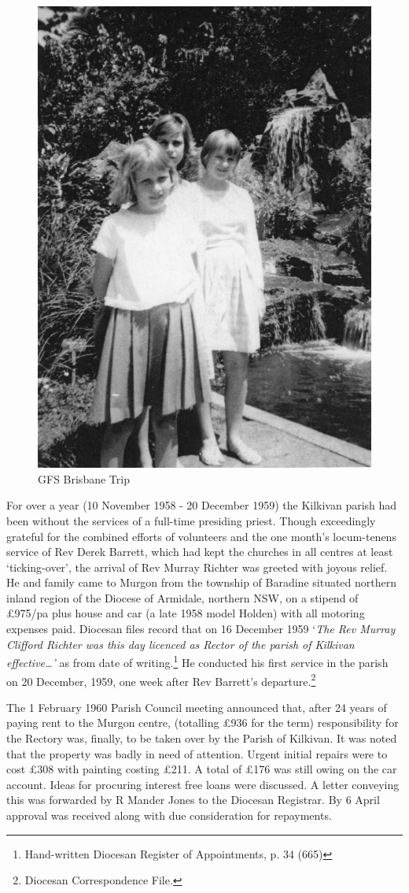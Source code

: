 \begin{figure}
\begin{center}
\includegraphics[width=.6\linewidth,center]{../images/gfsBrisbaneTrip.jpg}
\caption{GFS Brisbane Trip}
\end{center}
\end{figure}




For over a year (10 November 1958 - 20 December 1959) the Kilkivan parish had been without the services of a full-time presiding priest. Though exceedingly grateful for the combined efforts of volunteers and the one month's locum-tenens service of Rev Derek Barrett, which had kept the churches in all centres at least `ticking-over', the arrival of Rev Murray Richter was greeted with joyous relief. He and family came to Murgon from the township of Baradine situated northern inland region of the Diocese of Armidale, northern NSW, on a stipend of \pounds975/pa plus house and car (a late 1958 model Holden) with all motoring expenses paid. Diocesan files record that on 16 December 1959 `\emph{The Rev Murray Clifford Richter was this day licenced as Rector of the parish of Kilkivan effective\ldots'} as from date of writing.\footnote{Hand-written Diocesan Register of Appointments, p. 34 (665)} He conducted his first service in the parish on 20 December, 1959, one week after Rev Barrett's departure.\footnote{Diocesan Correspondence File.}


The 1 February 1960 Parish Council meeting announced that, after 24 years of paying rent to the Murgon centre, (totalling \pounds936 for the term) responsibility for the Rectory was, finally, to be taken over by the Parish of Kilkivan. It was noted that the property was badly in need of attention. Urgent initial repairs were to cost \pounds308 with painting costing \pounds211. A total of \pounds176 was still owing on the car account. Ideas for procuring interest free loans were discussed. A letter conveying this was forwarded by R Mander Jones to the Diocesan Registrar. By 6 April approval was received along with due consideration for repayments.









